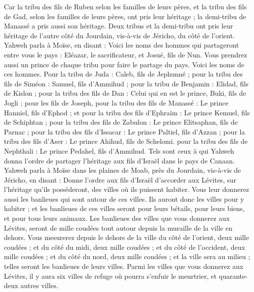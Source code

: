 \begin{multicols}{2}
Car la tribu des fils de Ruben selon les familles de leurs pères, et la tribu des fils de Gad, selon les familles de leurs pères, ont pris leur héritage ; la demi-tribu de Manassé a pris aussi son héritage.
Deux tribus et la demi-tribu ont pris leur héritage de l’autre côté du Jourdain, vis-à-vis de Jéricho, du côté de l’orient.
Yahweh parla à Moïse, en disant :
Voici les noms des hommes qui partageront entre vous le pays : Eléazar, le sacrificateur, et Josué, fils de Nun.
Vous prendrez aussi un prince de chaque tribu pour faire le partage du pays.
Voici les noms de ces hommes. Pour la tribu de Juda : Caleb, fils de Jephunné ;
pour la tribu des fils de Siméon : Samuel, fils d’Ammihud ;
pour la tribu de Benjamin : Elidad, fils de Kislon ;
pour la tribu des fils de Dan : Celui qui en est le prince, Buki, fils de Jogli ;
pour les fils de Joseph, pour la tribu des fils de Manassé : Le prince Hanniel, fils d'Ephod ;
et pour la tribu des fils d'Ephraïm : Le prince Kemuel, fils de Schiphtan ;
pour la tribu des fils de Zabulon : Le prince Elitsaphan, fils de Parnac ;
pour la tribu des fils d'Issacar : Le prince Paltiel, fils d’Azzan ;
pour la tribu des fils d'Aser : Le prince Ahihud, fils de Schelomi.
pour la tribu des fils de Nephthali : Le prince Pedahel, fils d’Ammihud.
Tels sont ceux à qui Yahweh donna l’ordre de partager l'héritage aux fils d'Israël dans le pays de Canaan.
\VerseOne{}Yahweh parla à Moïse dans les plaines de Moab, près du Jourdain, vis-à-vis de Jéricho, en disant :
Donne l’ordre aux fils d'Israël d’accorder aux Lévites, sur l’héritage qu’ils posséderont, des villes où ils puissent habiter. Vous leur donnerez aussi les banlieues qui sont autour de ces villes.
Ils auront donc les villes pour y habiter ; et les banlieues de ces villes seront pour leurs bétails, pour leurs biens, et pour tous leurs animaux.
Les banlieues des villes que vous donnerez aux Lévites, seront de mille coudées tout autour depuis la muraille de la ville en dehors.
Vous mesurerez depuis le dehors de la ville du côté de l'orient, deux mille coudées ; et du côté du midi, deux mille coudées ; et du côté de l'occident, deux mille coudées ; et du côté du nord, deux mille coudées ; et la ville sera au milieu ; telles seront les banlieues de leurs villes.
Parmi les villes que vous donnerez aux Lévites, il y aura six villes de refuge où pourra s’enfuir le meurtrier, et quarante-deux autres villes.

\end{multicols}
